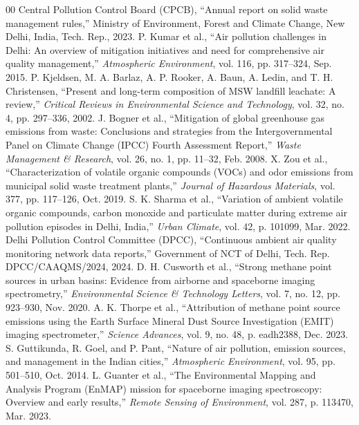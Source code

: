 \documentclass[conference]{IEEEtran}
\begin{document}

\begin{thebibliography}{00}
 Central Pollution Control Board (CPCB), ``Annual report on solid waste management rules,'' Ministry of Environment, Forest and Climate Change, New Delhi, India, Tech. Rep., 2023.
 P. Kumar et al., ``Air pollution challenges in Delhi: An overview of mitigation initiatives and need for comprehensive air quality management,'' \textit{Atmospheric Environment}, vol. 116, pp. 317--324, Sep. 2015.
 P. Kjeldsen, M. A. Barlaz, A. P. Rooker, A. Baun, A. Ledin, and T. H. Christensen, ``Present and long-term composition of MSW landfill leachate: A review,'' \textit{Critical Reviews in Environmental Science and Technology}, vol. 32, no. 4, pp. 297--336, 2002.
 J. Bogner et al., ``Mitigation of global greenhouse gas emissions from waste: Conclusions and strategies from the Intergovernmental Panel on Climate Change (IPCC) Fourth Assessment Report,'' \textit{Waste Management \& Research}, vol. 26, no. 1, pp. 11--32, Feb. 2008.
 X. Zou et al., ``Characterization of volatile organic compounds (VOCs) and odor emissions from municipal solid waste treatment plants,'' \textit{Journal of Hazardous Materials}, vol. 377, pp. 117--126, Oct. 2019.
 S. K. Sharma et al., ``Variation of ambient volatile organic compounds, carbon monoxide and particulate matter during extreme air pollution episodes in Delhi, India,'' \textit{Urban Climate}, vol. 42, p. 101099, Mar. 2022.
 Delhi Pollution Control Committee (DPCC), ``Continuous ambient air quality monitoring network data reports,'' Government of NCT of Delhi, Tech. Rep. DPCC/CAAQMS/2024, 2024.
 D. H. Cusworth et al., ``Strong methane point sources in urban basins: Evidence from airborne and spaceborne imaging spectrometry,'' \textit{Environmental Science \& Technology Letters}, vol. 7, no. 12, pp. 923--930, Nov. 2020.
 A. K. Thorpe et al., ``Attribution of methane point source emissions using the Earth Surface Mineral Dust Source Investigation (EMIT) imaging spectrometer,'' \textit{Science Advances}, vol. 9, no. 48, p. eadh2388, Dec. 2023.
 S. Guttikunda, R. Goel, and P. Pant, ``Nature of air pollution, emission sources, and management in the Indian cities,'' \textit{Atmospheric Environment}, vol. 95, pp. 501--510, Oct. 2014.
 L. Guanter et al., ``The Environmental Mapping and Analysis Program (EnMAP) mission for spaceborne imaging spectroscopy: Overview and early results,'' \textit{Remote Sensing of Environment}, vol. 287, p. 113470, Mar. 2023.

\end{thebibliography}
\end{document}
